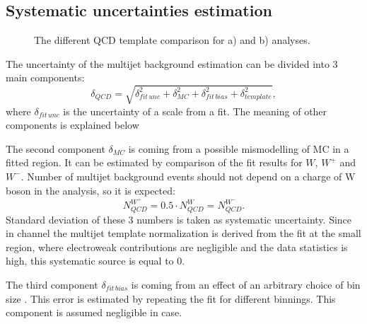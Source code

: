 \subsection{Systematic uncertainties estimation }\label{sec:QCDUnc}

\begin{figure}[!tbp]
\begin{minipage}[h]{0.49\linewidth}
\end{minipage}
\hfill
\begin{minipage}[h]{0.49\linewidth}
\end{minipage}
\caption{The different QCD template comparison for a) \wenu and b) \wmunu analyses.}
\label{ris:TemplateVar}
\end{figure}

The uncertainty of the multijet background estimation can be divided into 3 main components:
\begin{equation}
\delta_{QCD} = \sqrt{ \delta_{fit\, unc}^{2}+\delta_{MC}^{2}+\delta_{fit\, bias}^{2}+\delta_{template}^{2}}, 
\end{equation}
where $\delta_{fit\, unc}$ is the uncertainty of a scale from a \chiD fit. The meaning of other components is explained below

The second component $\delta_{MC}$ is coming from a possible mismodelling of MC in a fitted region. It can be estimated by comparison of the fit results for $W$, $W^{+}$ and $W^{-}$. Number of multijet background events should not depend on a charge of W boson in the analysis, so it is expected:
\begin{equation}
N_{QCD}^{W^{+}}=0.5 \cdot N_{QCD}^{W} =N_{QCD}^{W^{-}}.
\end{equation}
Standard deviation of these 3 numbers is taken as systematic uncertainty. Since in \wmunu channel the multijet template normalization is derived from the fit at the small \mtw region, where electroweak contributions are negligible and the data statistics is high, this systematic source is equal to 0.



The third component $\delta_{fit\, bias}$ is coming from an effect of an arbitrary choice of bin size . This error is estimated by repeating the fit for different binnings. This component is assumed negligible in \wmunu case. 

